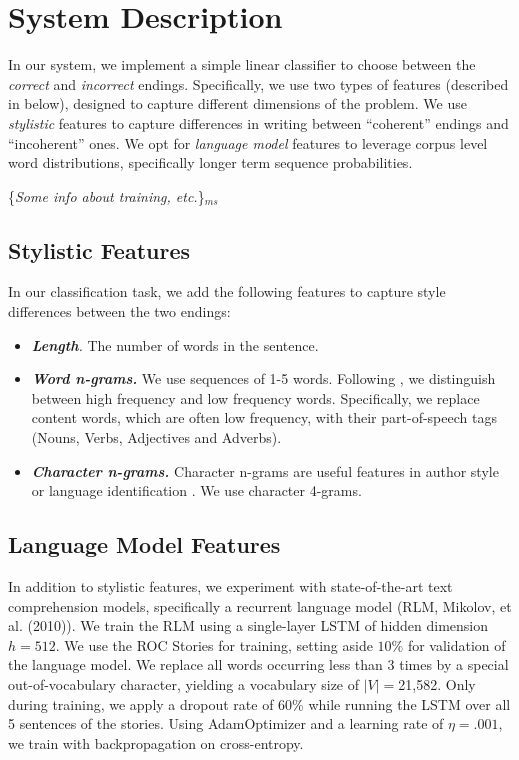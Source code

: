 \documentclass[11pt]{article}
\newcommand{\ms}[1]{{\color{cyan}\{\textit{#1}\}$_{ms}$}}
\begin{document}
\section{System Description}
In our system, we implement a simple linear classifier to choose between the \textit{correct} and \textit{incorrect} endings.
Specifically, we use two types of features (described in below), designed to capture different dimensions of the problem. We use \textit{stylistic} features to capture differences in writing between ``coherent'' endings and ``incoherent'' ones. We opt for \textit{language model} features to leverage corpus level word distributions, specifically longer term sequence probabilities.

\ms{Some info about training, etc.}

\subsection{Stylistic Features}
In our classification task, we add the following features to capture style differences between the two endings:
\begin{itemize}
\item\textit{\textbf{Length}.} The number of words in the sentence.
\item\textit{\textbf{Word n-grams.}} We use sequences of 1-5 words. Following \cite{Tsur:2010,Schwartz:2013}, we distinguish between high frequency and low frequency words. 
Specifically, we replace content words, which are often low frequency, with their part-of-speech tags (Nouns, Verbs, Adjectives and Adverbs).
\item\textit{\textbf{Character n-grams.}} Character n-grams are useful features in author style \cite{Stamatatos:2009} or language identification \cite{lui2011cross}.
We use character 4-grams.
\end{itemize}

\subsection{Language Model Features}
In addition to stylistic features, we experiment with state-of-the-art text comprehension models, specifically a recurrent language model (RLM, Mikolov, et al. (2010)\nocite{mikolov2010recurrent}).
We train the RLM using a single-layer LSTM \cite{hochreiter1997long} of hidden dimension $h=512$.
We use the ROC Stories for training, setting aside $10\%$ for validation of the language model. 
We replace all words occurring less than 3 times by a special out-of-vocabulary character, yielding a vocabulary size of $|V|=$21,582.
Only during training, we apply a dropout rate of 60\% while running the LSTM over all 5 sentences of the stories. 
Using AdamOptimizer \cite{kingma2014adam} and a learning rate of $\eta=.001$, we train with backpropagation on cross-entropy. %
\end{document}
